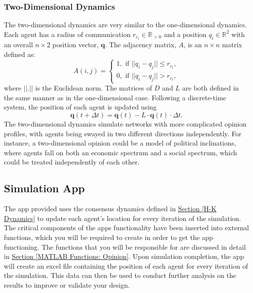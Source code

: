 \documentclass[../CourseManual.tex]{subfiles}
\begin{document}
\subsubsection{Two-Dimensional Dynamics} \label{Two-Dimensional Dynamics}
The two-dimensional dynamics are very similar to the one-dimensional dynamics. Each agent has a radius of communication $r_{c_i} \in \mathbb{R}_{>0}$ and a position ${q}_i \in \mathbb{R}^2$ with an overall $n \times 2$ position vector, $\boldsymbol{q}$. The adjacency matrix, $A$, is an $n \times n$ matrix defined as:
\[
A(i,j) = 
\begin{cases}
1, \text{ if } ||{q}_i - {q}_j|| \leq r_{c_i}, \\
0, \text{ if } ||{q}_i - {q}_j|| > r_{c_i},
\end{cases}
\]
where $||.||$ is the Euclidean norm. The matrices of $D$ and $L$ are both defined in the same manner as in the one-dimensional case. Following a discrete-time system, the position of each agent is updated using
\[
\boldsymbol{q}(t+\Delta t) = \boldsymbol{q}(t) - L \cdot \boldsymbol{q}(t) \cdot \Delta t.
\]
The two-dimensional dynamics simulate networks with more complicated opinion profiles, with agents being swayed in two different directions independently. For instance, a two-dimensional opinion could be a model of political inclinations, where agents fall on both an economic spectrum
and a social spectrum, which could be treated independently of each other.

\subsection{Simulation App} \label{Simulation App: Opinion}
The app provided uses the consensus dynamics defined in \hyperref[H-K Dynamics]{Section \ref{H-K Dynamics}} to update each agent’s location for every iteration of the simulation. The critical components of the apps functionality have been inserted into external functions, which you will be required to create in order to get the app functioning.  The functions that you will be responsible for are discussed in detail in \hyperref[MATLAB Functions: Opinion]{Section \ref{MATLAB Functions: Opinion}}.  Upon simulation completion, the  app  will  create  an  excel  file  containing  the  position  of  each  agent  for  every  iteration  of  the simulation.  This data can then be used to conduct further analysis on the results to improve or validate your design.
\end{document}
